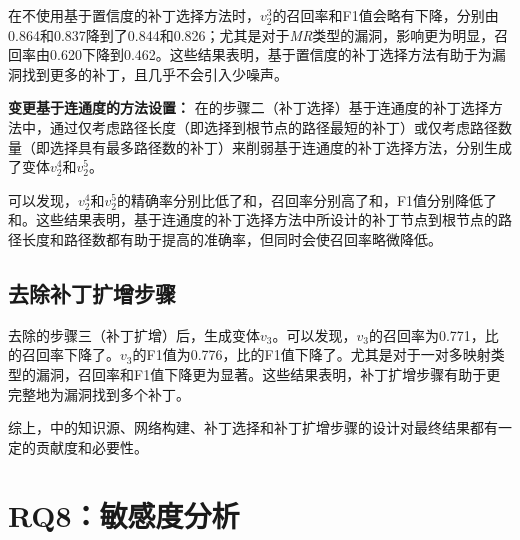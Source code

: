 在不使用基于置信度的补丁选择方法时，$v_2^3$的召回率和F1值会略有下降，分别由0.864和0.837降到了0.844和0.826；尤其是对于\textit{MR}类型的漏洞，影响更为明显，召回率由0.620下降到0.462。这些结果表明，基于置信度的补丁选择方法有助于为漏洞找到更多的补丁，且几乎不会引入少噪声。


\textbf{变更基于连通度的方法设置：}
在\tool 的步骤二（补丁选择）基于连通度的补丁选择方法中，通过仅考虑路径长度（即选择到根节点的路径最短的补丁）或仅考虑路径数量（即选择具有最多路径数的补丁）来削弱基于连通度的补丁选择方法，分别生成了变体$v_2^4$和$v_2^5$。

可以发现，$v_2^4$和$v_2^5$的精确率分别比\tool 低了和，召回率分别高了和，F1值分别降低了和。这些结果表明，基于连通度的补丁选择方法中所设计的补丁节点到根节点的路径长度和路径数都有助于提高\tool 的准确率，但同时会使召回率略微降低。

\subsection{去除补丁扩增步骤}
去除\tool 的步骤三（补丁扩增）后，生成变体$v_3$。可以发现，$v_3$的召回率为0.771，比\tool 的召回率下降了。$v_3$的F1值为0.776，比\tool 的F1值下降了。尤其是对于一对多映射类型的漏洞，召回率和F1值下降更为显著。这些结果表明，补丁扩增步骤有助于\tool 更完整地为漏洞找到多个补丁。

综上，\tool 中的知识源、网络构建、补丁选择和补丁扩增步骤的设计对最终结果都有一定的贡献度和必要性。


\section{RQ8：敏感度分析}\label{sec:sensitivity}

